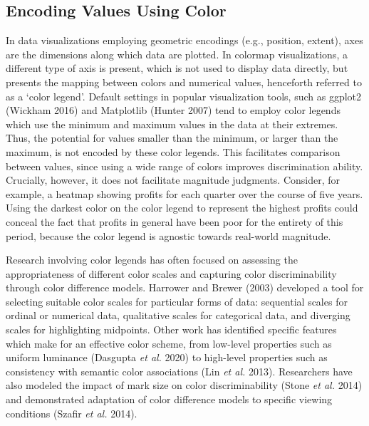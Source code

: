 \documentclass[
]{interact}
\begin{document}
\hypertarget{encoding-values-using-color}{%
\subsection{Encoding Values Using
Color}\label{encoding-values-using-color}}

In data visualizations employing geometric encodings (e.g., position,
extent), axes are the dimensions along which data are plotted. In
colormap visualizations, a different type of axis is present, which is
not used to display data directly, but presents the mapping between
colors and numerical values, henceforth referred to as a `color legend'.
Default settings in popular visualization tools, such as ggplot2
(Wickham 2016) and Matplotlib (Hunter 2007) tend to employ color legends
which use the minimum and maximum values in the data at their extremes.
Thus, the potential for values smaller than the minimum, or larger than
the maximum, is not encoded by these color legends. This facilitates
comparison between values, since using a wide range of colors improves
discrimination ability. Crucially, however, it does not facilitate
magnitude judgments. Consider, for example, a heatmap showing profits
for each quarter over the course of five years. Using the darkest color
on the color legend to represent the highest profits could conceal the
fact that profits in general have been poor for the entirety of this
period, because the color legend is agnostic towards real-world
magnitude.

Research involving color legends has often focused on assessing the
appropriateness of different color scales and capturing color
discriminability through color difference models. Harrower and Brewer
(2003) developed a tool for selecting suitable color scales for
particular forms of data: sequential scales for ordinal or numerical
data, qualitative scales for categorical data, and diverging scales for
highlighting midpoints. Other work has identified specific features
which make for an effective color scheme, from low-level properties such
as uniform luminance (Dasgupta \emph{et al.} 2020) to high-level
properties such as consistency with semantic color associations (Lin
\emph{et al.} 2013). Researchers have also modeled the impact of mark
size on color discriminability (Stone \emph{et al.} 2014) and
demonstrated adaptation of color difference models to specific viewing
conditions (Szafir \emph{et al.} 2014).
\end{document}
